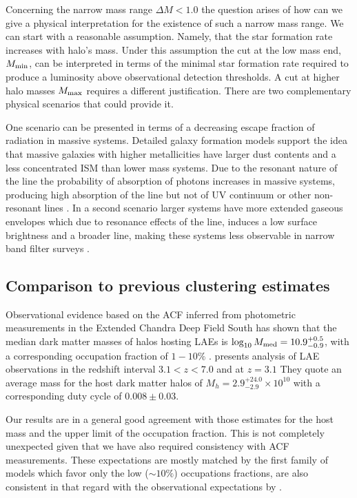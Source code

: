 \documentclass{emulateapj}
\newcommand{\ly}{{\ifmmode{{\rm Ly}\alpha}\else{Ly$\alpha$~}\fi}}
\newcommand{\hMsun}{{\ifmmode{h^{-1}{\rm
        {M_{\odot}}}}\else{$h^{-1}{\rm{M_{\odot}}}$}\fi}}
\newcommand{\Msun}{{\ifmmode{{\rm {M_{\odot}}}}\else{${\rm{M_{\odot}}}$}\fi}}
\begin{document}
Concerning the narrow mass range $\Delta M <1.0$ the question arises
of how can we give a physical interpretation for the existence of such
a narrow mass range. We can start with a reasonable
assumption. Namely, that the star formation rate increases with halo's
mass. Under this assumption the cut at the low mass end, $M_{\rm
  min}$, can be interpreted in terms of the minimal star formation
rate required to produce a \ly luminosity above observational
detection thresholds.   A cut at higher halo masses $M_{\rm  max}$
requires a different justification. There are two complementary
physical scenarios that could provide it. 

One scenario can be presented in terms of a decreasing escape fraction
of \ly radiation in massive systems. Detailed galaxy formation models
support the idea that massive galaxies with higher metallicities have
larger dust contents and a less concentrated ISM than lower mass
systems. Due to the resonant nature of the \ly line the probability of
absorption  of \ly photons increases in massive systems, producing
high absorption of the \ly line but not of UV continuum or other
non-resonant lines \citep{Laursen2009,ForeroRomero2011}. In a second
scenario larger systems have more extended gaseous envelopes which due
to resonance effects of the \ly line, induces a low surface brightness
and a broader line, making these systems less observable in narrow
band filter surveys \citep{Laursen2009,Zheng2010}.    

\subsection{Comparison to previous clustering estimates}

Observational evidence based on the ACF inferred from photometric
measurements in the Extended Chandra Deep Field South has shown that
the median dark matter masses of halos hosting LAEs is
$\log_{10}M_{\rm  med}=10.9^{+0.5}_{-0.9}$\Msun, with a corresponding
occupation fraction of $1-10\%$  \citep{Gawiser07}.  \cite{Ouchi2010}
presents analysis of LAE observations in the redshift interval
$3.1<z<7.0$ and at $z=3.1$ They quote an average mass for the host
dark matter halos of $M_{h}=2.9^{+24.0}_{-2.9}\times 10^{10}$ \hMsun
with a corresponding duty cycle of $0.008\pm 0.03$.  

Our results are in a general good agreement with those estimates for
the host mass and the upper limit of the occupation fraction. This is
not completely unexpected given that we have also required consistency
with ACF measurements. These expectations are mostly matched by
the first family of models which favor only the  low
($\sim 10\%$) occupations fractions, are also consistent in that
regard with the observational expectations by \cite{Gawiser07}. 
\end{document}
